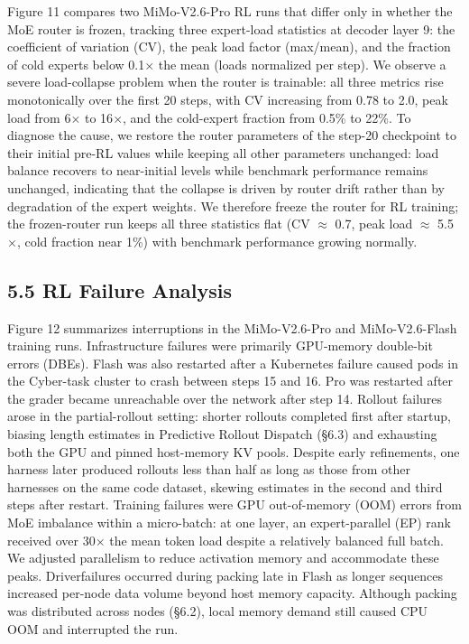 \documentclass[
  10
]{article}
\begin{document}
Figure 11 compares two MiMo-V2.6-Pro RL runs that differ only in whether
the MoE router is frozen, tracking three expert-load statistics at
decoder layer 9: the coefficient of variation (CV), the peak load factor
(max/mean), and the fraction of cold experts below 0.1$\times$ the mean (loads
normalized per step). We observe a severe load-collapse problem when the
router is trainable: all three metrics rise monotonically over the first
20 steps, with CV increasing from 0.78 to 2.0, peak load from 6$\times$ to 16$\times$,
and the cold-expert fraction from 0.5\% to 22\%. To diagnose the cause,
we restore the router parameters of the step-20 checkpoint to their
initial pre-RL values while keeping all other parameters unchanged: load
balance recovers to near-initial levels while benchmark performance
remains unchanged, indicating that the collapse is driven by router
drift rather than by degradation of the expert weights. We therefore
freeze the router for RL training; the frozen-router run keeps all three
statistics flat (CV $\approx$ 0.7, peak load $\approx$ 5.5$\times$, cold fraction near 1\%)
with benchmark performance growing normally.

\subsection{5.5 RL Failure Analysis}\label{rl-failure-analysis}

Figure 12 summarizes interruptions in the MiMo-V2.6-Pro and
MiMo-V2.6-Flash training runs. Infrastructure failures were primarily
GPU-memory double-bit errors (DBEs). Flash was also restarted after a
Kubernetes failure caused pods in the Cyber-task cluster to crash
between steps 15 and 16. Pro was restarted after the grader became
unreachable over the network after step 14. Rollout failures arose in
the partial-rollout setting: shorter rollouts completed first after
startup, biasing length estimates in Predictive Rollout Dispatch (§6.3)
and exhausting both the GPU and pinned host-memory KV pools. Despite
early refinements, one harness later produced rollouts less than half as
long as those from other harnesses on the same code dataset, skewing
estimates in the second and third steps after restart. Training failures
were GPU out-of-memory (OOM) errors from MoE imbalance within a
micro-batch: at one layer, an expert-parallel (EP) rank received over
30$\times$ the mean token load despite a relatively balanced full batch. We
adjusted parallelism to reduce activation memory and accommodate these
peaks. Driverfailures occurred during packing late in Flash as longer
sequences increased per-node data volume beyond host memory capacity.
Although packing was distributed across nodes (§6.2), local memory
demand still caused CPU OOM and interrupted the run.
\end{document}
